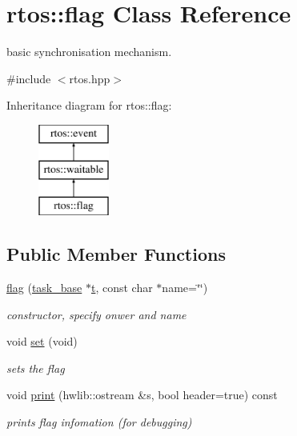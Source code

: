 \hypertarget{classrtos_1_1flag}{}\section{rtos\+:\+:flag Class Reference}
\label{classrtos_1_1flag}


basic synchronisation mechanism.  




{\ttfamily \#include $<$rtos.\+hpp$>$}

Inheritance diagram for rtos\+:\+:flag\+:\begin{figure}[H]
\begin{center}
\leavevmode
\includegraphics[height=3.000000cm]{classrtos_1_1flag}
\end{center}
\end{figure}
\subsection*{Public Member Functions}
\begin{DoxyCompactItemize}
\item 
\hyperlink{classrtos_1_1flag_af4fa671e37438103a9f12f7e0c87a6b2}{flag} (\hyperlink{classrtos_1_1task__base}{task\+\_\+base} $\ast$\hyperlink{classrtos_1_1event_aa83745aabc941145f00386fd63f6b557}{t}, const char $\ast$name=\char`\"{}\char`\"{})
\begin{DoxyCompactList}\small\item\em constructor, specify onwer and name \end{DoxyCompactList}\item 
void \hyperlink{classrtos_1_1flag_a7372dff631de89809f25edef544ff884}{set} (void)
\begin{DoxyCompactList}\small\item\em sets the flag \end{DoxyCompactList}\item 
void \hyperlink{classrtos_1_1flag_a49932267b755b23e8325849527330c2f}{print} (hwlib\+::ostream \&s, bool header=true) const \hypertarget{classrtos_1_1flag_a49932267b755b23e8325849527330c2f}{}\label{classrtos_1_1flag_a49932267b755b23e8325849527330c2f}

\begin{DoxyCompactList}\small\item\em prints flag infomation (for debugging) \end{DoxyCompactList}\end{DoxyCompactItemize}
